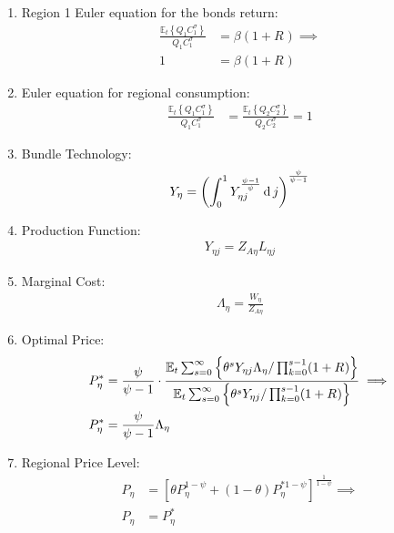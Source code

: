 \documentclass[../thesis.tex]{subfiles}
\begin{document}
\begin{enumerate}
	\item Region 1 Euler equation for the bonds return:
	\begin{align}
		\frac{\mathbb{E}_{t} \left\{Q_{1} C_{1}^{\sigma} \right\}}{Q_{1} C_{1}^{\sigma}} &= \beta (1 + R_{}) \implies \nonumber \\
		1 &= \beta (1 + R_{}) \label{eq_v6:reg-ss-bonds-euler-equation}
	\end{align}
	
	\item Euler equation for regional consumption:
	\begin{align}
		\frac{\mathbb{E}_{t} \left\{ Q_{1} C_{1}^{\sigma} \right\}}{Q_{1} C_{1}^{\sigma}} &= \frac{\mathbb{E}_{t} \left\{ Q_{2} C_{2}^{\sigma} \right\}}{Q_{2} C_{2}^{\sigma}} = 1 \label{eq_v6:reg-ss-bonds-euler-equation-2}
	\end{align}
	
	\item Bundle Technology:
	\begin{align}
		Y_{\eta} = \left( \int_{0}^{1} Y_{\eta j}^{\frac{\psi-1}{\psi}} \operatorname{d} j \right)^{\frac{\psi}{\psi-1}} \label{eq_v6:reg-ss-final-goods-firm-bundle-rule}
	\end{align}
	
	\item Production Function:
	\begin{align}
		Y_{\eta j} = Z_{A\eta} L_{\eta j} \label{eq_v6:reg-ss-int-good-firm-production-function}
	\end{align}
	
	\item Marginal Cost:
	\begin{align}
		\Lambda_{\eta} = \frac{W_{\eta}}{Z_{A\eta}} \label{eq_v6:reg-ss-int-good-firm-FOC-Lt}
	\end{align}
	
	\item Optimal Price:
	\begin{align}
		P_{\eta}^{\ast} &= \frac{\psi}{\psi-1} \cdot \frac{ {\mathbb{E}_{t}} \sum_{s=0}^{\infty} \left\{ \theta^s Y_{\eta j} \Lambda_{\eta} / \prod_{k=0}^{s-1}(1+R_{}) \right\}} {{\mathbb{E}_{t}} \sum_{s=0}^{\infty} \left\{ \theta^s Y_{\eta j} / \prod_{k=0}^{s-1}(1 + R_{}) \right\}} \implies \nonumber \\
		P_{\eta}^{\ast} &= \frac{\psi}{\psi-1} \Lambda_{\eta} \label{eq_v6:reg-ss-int-good-firm-optimal-price-FOC-3}
	\end{align}
	
	\item Regional Price Level:
	\begin{align}
		P_{\eta} &= \left[ \theta P_{\eta}^{1-\psi} + (1-\theta) P_{\eta}^{\ast 1-\psi} \right]^\frac{1}{1-\psi} \implies \nonumber \\
		P_{\eta} &= P_{\eta}^{\ast} \label{eq_v6:reg-ss-general-price-level}
	\end{align}
	

\end{enumerate}
\end{document}
